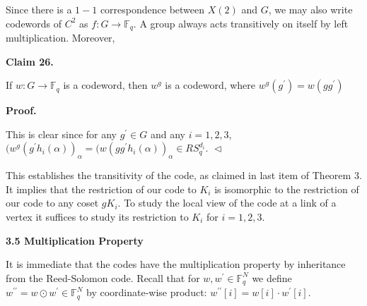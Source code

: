 Since there is a $1-1$ correspondence between $X(2)$ and $G$, we may also write codewords of $C^{2}$ as $f:G\to\mathbb{F}_{q}$. A group always acts transitively on itself by left multiplication. Moreover,\par





\par\medskip\noindent\textbf{
Claim 26. 
}\par



If $w:G\to\mathbb{F}_{q}$ is a codeword, then $w^{g}$ is a codeword, where $w^{g}(g^{\prime})=w(gg^{\prime})$\par







\par\medskip\noindent\textbf{
\textbf{Proof}.}\par




This is clear since for any $g^{\prime}\in G$ and any $i=1,2,3$, $(w^{g}(g^{\prime}h_{i}(\alpha))_{\alpha}=(w(gg^{\prime}h_{i}(\alpha))_{\alpha}\in RS_{q}^{d_{i}}$.
$\vartriangleleft$\par




This establishes the transitivity of the code, as claimed in last item of Theorem 3. It implies that the restriction of our code to $K_{i}$ is isomorphic to the restriction of our code to any coset $gK_{i}$. To study the local view of the code at a link of a vertex it suffices to study its restriction to $K_{i}$ for $i=1,2,3$.\par






\par\medskip\noindent\textbf{
3.5 Multiplication Property}\par




It is immediate that the codes have the multiplication property by inheritance from the Reed-Solomon code. Recall that for $w,w^{\prime}\in\mathbb{F}_{q}^{N}$ we define $w^{\prime\prime}=w\odot w^{\prime}\in\mathbb{F}_{q}^{N}$ by coordinate-wise product: $w^{\prime\prime}[i]=w[i]\cdot w^{\prime}[i]$.\par



